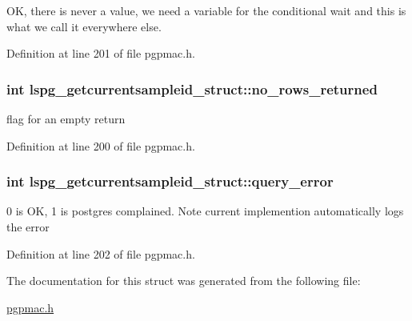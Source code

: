 O\-K, there is never a value, we need a variable for the conditional wait and this is what we call it everywhere else. 



Definition at line 201 of file pgpmac.\-h.

\hypertarget{structlspg__getcurrentsampleid__struct_a06758730db55730eb10d2d63e2520d71}{
\subsubsection[{no\-\_\-rows\-\_\-returned}]{\setlength{\rightskip}{0pt plus 5cm}int lspg\-\_\-getcurrentsampleid\-\_\-struct\-::no\-\_\-rows\-\_\-returned}}\label{structlspg__getcurrentsampleid__struct_a06758730db55730eb10d2d63e2520d71}


flag for an empty return 



Definition at line 200 of file pgpmac.\-h.

\hypertarget{structlspg__getcurrentsampleid__struct_ac81d3b649befe470ef32453c9b83d334}{
\subsubsection[{query\-\_\-error}]{\setlength{\rightskip}{0pt plus 5cm}int lspg\-\_\-getcurrentsampleid\-\_\-struct\-::query\-\_\-error}}\label{structlspg__getcurrentsampleid__struct_ac81d3b649befe470ef32453c9b83d334}


0 is O\-K, 1 is postgres complained. Note current implemention automatically logs the error 



Definition at line 202 of file pgpmac.\-h.



The documentation for this struct was generated from the following file\-:\begin{DoxyCompactItemize}
\item 
\hyperlink{pgpmac_8h}{pgpmac.\-h}\end{DoxyCompactItemize}
